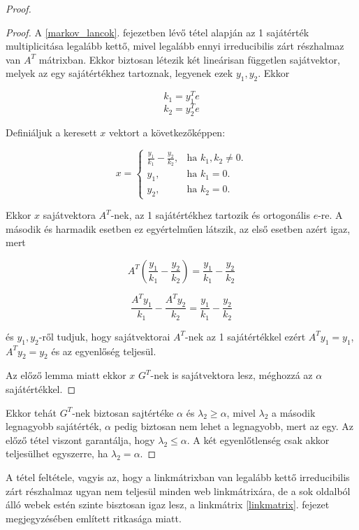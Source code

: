\documentclass[12pt,a4paper]{article}
\begin{document}
\begin{proof}
\begin{proof}
		A \ref{markov_lancok}. fejezetben lévő tétel alapján az 1 sajátérték multiplicitása legalább kettő, mivel legalább ennyi irreducibilis zárt részhalmaz van $A^T$ mátrixban. Ekkor biztosan létezik két lineárisan független sajátvektor, melyek az egy sajátértékhez tartoznak, legyenek ezek $y_1,y_2$. Ekkor
		
		\[ k_1 = y_1^T e \]
		\[ k_2 = y_2^T e \]
		
		Definiáljuk a keresett $x$ vektort a következőképpen:
		
		\begin{equation*}
		x=\begin{cases}
		\frac{y_1}{k_1} - \frac{y_2}{k_2}, & \text{ha $k_1,k_2 \neq 0$}.\\
		y_1, & \text{ha $k_1 = 0$}. \\
		y_2, & \text{ha $k_2 = 0$}. 
		\end{cases}
		\end{equation*}
		
		Ekkor $x$ sajátvektora $A^T$-nek, az 1 sajátértékhez tartozik és ortogonális $e$-re. A második és harmadik esetben ez egyértelműen látszik, az első esetben azért igaz, mert 
		
		\[ A^T (\frac{y_1}{k_1} - \frac{y_2}{k_2}) = \frac{y_1}{k_1} - \frac{y_2}{k_2} \] 
		
		\[ \frac{A^T y_1}{k_1} - \frac{A^T y_2}{k_2} = \frac{y_1}{k_1} - \frac{y_2}{k_2} \]
		
		és $y_1,y_2$-ről tudjuk, hogy sajátvektorai $A^T$-nek az 1 sajátértékkel ezért $A^T y_1 = y_1$, $A^T y_2 = y_2$ és az egyenlőség teljesül. 
		
		Az előző lemma miatt ekkor $x$ $G^T$-nek is sajátvektora lesz, méghozzá az $\alpha$ sajátértékkel.  
		\phantom\qedhere
	\end{proof} 

	Ekkor tehát $G^T$-nek biztosan sajtértéke $\alpha$ és $\lambda_2 \geq \alpha$, mivel $\lambda_2$ a második legnagyobb sajátérték, $\alpha$ pedig biztosan nem lehet a legnagyobb, mert az egy. Az előző tétel viszont garantálja, hogy $\lambda_2 \leq \alpha$. A két egyenlőtlenség csak akkor teljesülhet egyszerre, ha $\lambda_2 = \alpha$.
\end{proof}
\vspace{0.2cm}

A tétel feltétele, vagyis az, hogy a linkmátrixban van legalább kettő irreducibilis zárt részhalmaz ugyan nem teljesül minden web linkmátrixára, de a sok oldalból álló webek estén szinte bisztosan igaz lesz, a linkmátrix \ref{linkmatrix}. fejezet megjegyzésében említett ritkasága miatt.
\end{document}
